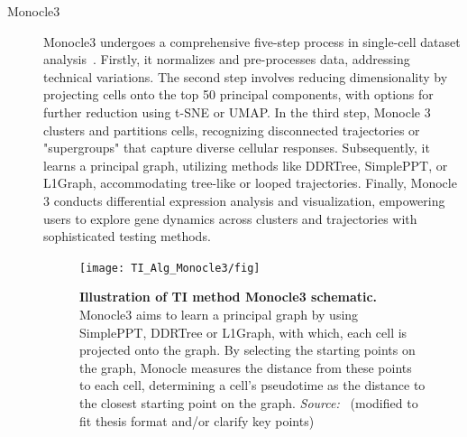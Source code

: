 \begin{description}
    \item[Monocle3]
    Monocle3 undergoes a comprehensive five-step process in single-cell dataset analysis~\citep{cao2019monocle3}. Firstly, it normalizes and pre-processes data, addressing technical variations. The second step involves reducing dimensionality by projecting cells onto the top 50 principal components, with options for further reduction using t-SNE or UMAP. In the third step, Monocle 3 clusters and partitions cells, recognizing disconnected trajectories or "supergroups" that capture diverse cellular responses. Subsequently, it learns a principal graph, utilizing methods like DDRTree, SimplePPT, or L1Graph, accommodating tree-like or looped trajectories. Finally, Monocle 3 conducts differential expression analysis and visualization, empowering users to explore gene dynamics across clusters and trajectories with sophisticated testing methods.
    \begin{figure}[ht!]
    	\centering
    	\texttt{[image: TI\_Alg\_Monocle3/fig]}
    	\vspace{0.1cm}
    	\caption[Illustration of TI method Monocle3 schematic.]{\textbf{Illustration of TI method Monocle3 schematic.} Monocle3 aims to learn a principal graph by using SimplePPT, DDRTree or L1Graph, with which, each cell is projected onto the graph. By selecting the starting points on the graph, Monocle measures the distance from these points to each cell, determining a cell's pseudotime as the distance to the closest starting point on the graph. \emph{Source:~\cite{cao2019monocle3}} (modified to fit thesis format and/or clarify key points)
    	}
    	\label{fig:TI_Alg_Monocle3}
    \end{figure}


\end{description}
